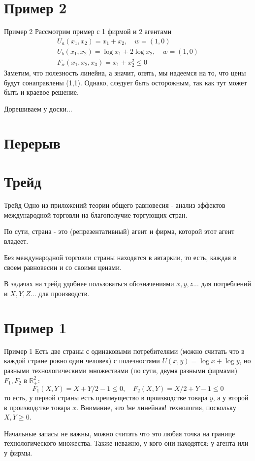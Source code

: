 \documentclass{beamer}
\begin{document}
\section{Пример 2}
\begin{frame}{Пример 2}
Рассмотрим пример с 1 фирмой и 2 агентами
\begin{gather*}
	U_a(x_1, x_2) = x_1 + x_2, \quad w = (1,0)\\
	U_b(x_1, x_2) = \log x_1 + 2 \log x_2, \quad w = (1,0)\\
	F_{\alpha}(x_1, x_2, x_3) = x_1 + x^2_2 \leqslant 0
\end{gather*}
Заметим, что полезность линейна, а значит, опять, мы надеемся на то, что цены будут сонаправлены (1,1). Однако, следует быть осторожным, так как тут может быть и краевое решение.

Дорешиваем у доски...
\end{frame}

\section{Перерыв}
\section{Трейд}

\begin{frame}{Трейд}
Одно из приложений теории общего равновесия - анализ эффектов международной торговли на благополучие торгующих стран. 

По сути, страна - это (репрезентативный) агент и фирма, которой этот агент владеет.

Без международной торговли страны находятся в \alert{автаркии}, то есть, каждая в своем равновесии и со своими ценами.


В задачах на трейд удобнее пользоваться обозначениями $x,y,z...$ для потреблений и $X,Y,Z...$ для производств.
\end{frame}

\section{Пример 1}

\begin{frame}{Пример 1}
Есть две страны с одинаковыми потребителями (можно считать что в каждой стране ровно один человек) с полезностями $U(x,y) = \log x + \log y$, но разными технологическими множествами (по сути, двумя разными фирмами) $F_1, F_2$ в $\mathbb{R}^2_{+}$:
$$ F_1(X,Y) = X + Y/2 - 1 \leqslant 0, \quad F_2(X,Y) = X/2 + Y - 1\leqslant 0 $$
то есть, у первой страны есть преимущество в производстве товара $y$, а у второй в производстве товара $x$. Внимание, это !\alert{не линейная}! технология, поскольку $X,Y \geqslant 0$.

Начальные запасы не важны, можно считать что это любая точка на границе технологического множества. Также неважно, у кого они находятся: у агента или у фирмы.

\end{frame}
\end{document}
